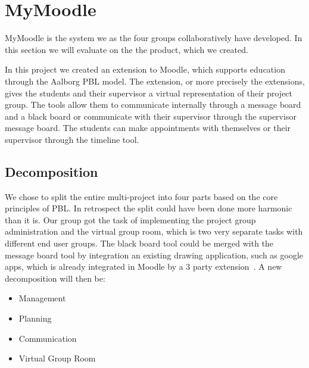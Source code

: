 \section{MyMoodle}
MyMoodle is the system we as the four groups collaboratively have developed.
In this section we will evaluate on the the product, which we created.


In this project we created an extension to Moodle, which supports education through the Aalborg PBL model. 
The extension, or more precisely the extensions, gives the students and their supervisor a virtual representation of their project group. 
The tools allow them to communicate internally through a message board and a black board or communicate with their supervisor through the supervisor message board.
The students can make appointments with themselves or  their supervisor through the timeline tool.


\subsection{Decomposition}
We chose to split the entire multi-project into four parts based on the core principles of PBL. 
In retrospect the split could have been done more harmonic than it is.
Our group got the task of implementing the project group administration and the virtual group room, which is two very separate tasks with different end user groups. 
The black board tool could be merged with the message board tool by integration an existing drawing application, such as google apps, which is already integrated in Moodle by a 3\rd{} party extension~\cite{moodlegoogleapp}. 
A new decomposition will then be:
\begin{itemize}
	\item Management
	\item Planning
	\item Communication
	\item Virtual Group Room
\end{itemize}


